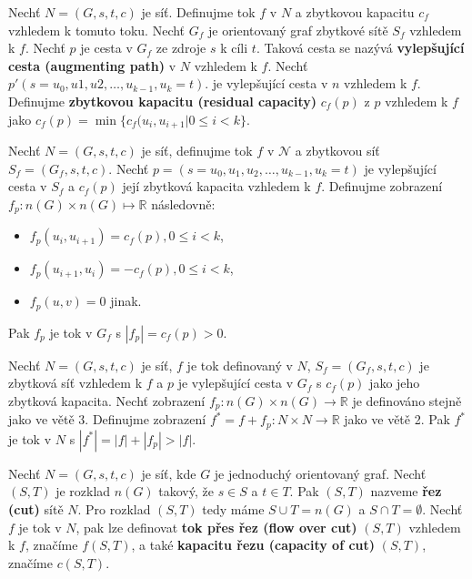 \begin{definition}
Nechť $N = (G, s, t, c)$ je síť. Definujme tok $f$ v $N$ a zbytkovou kapacitu $c_f$ vzhledem k tomuto toku. Nechť $G_f$ je orientovaný graf zbytkové sítě $S_f$ vzhledem k $f$. Nechť $p$ je cesta v $G_f$ ze zdroje $s$ k cíli $t$. Taková cesta se nazývá \textbf{vylepšující cesta (augmenting path)} v $N$ vzhledem k $f$. Nechť $p '(s = u_0, u1, u2, \ldots, u_{k-1}, u_k = t)$. je vylepšující cesta v $n$ vzhledem k $f$. Definujme \textbf{zbytkovou kapacitu (residual capacity)} $c_f (p)$ z $p$ vzhledem k $f$ jako $c_f (p) = \min \{ c_f (u_i, u_{i+1} | 0 \leq i  < k\}$.
\end{definition}

\begin{theorem}[3]
Nechť $N=(G,s,t,c)$ je síť, definujme tok $f$  v $\mathcal{N}$ a zbytkovou síť $S_f=(G_f,s,t,c)$. Nechť
$p=(s=u_0,u_1,u_2,\ldots,u_{k-1},u_k=t)$ je vylepšující cesta v $S_f$ a $c_f(p)$ její zbytková kapacita vzhledem k $f$. Definujme zobrazení $f_p: n(G)\times n(G)\mapsto \mathbb{R}$ následovně:
\begin{itemize}
    \item $f_p(u_i,u_{i+1})=c_f(p),0 \leq i < k$,
    \item $f_p(u_{i+1},u_i)=-c_f(p),0 \leq i < k$,
    \item $f_p(u,v)=0$ jinak.
\end{itemize}
Pak $f_p$ je tok v $G_f$ s $|f_p|=c_f(p) > 0$.
\end{theorem}

\begin{theorem}
Nechť $N=(G,s,t,c)$ je síť, $f$ je tok definovaný v $N$, $S_f=(G_f,s,t,c)$ je zbytková síť vzhledem k $f$ a $p$ je vylepšující cesta v $G_f$ s $c_f (p)$ jako jeho zbytková kapacita. Nechť zobrazení $f_p : n(G) \times n(G) \rightarrow \mathbb{R}$ je definováno stejně jako ve větě 3. Definujme zobrazení $f^{*} = f + f_p : N \times N \rightarrow \mathbb{R}$ jako ve větě 2. Pak $f^{*}$ je tok v $N$ s $ | f^{*} | = |f| + |f_p | > | f |$.
\end{theorem}

\begin{definition}
    Nechť $N=(G,s,t,c)$ je síť, kde $G$ je jednoduchý orientovaný graf. Nechť $(S,T)$ je rozklad $n(G)$ takový, že $s \in S$ a $t \in T$. Pak $(S,T)$ nazveme \textbf{řez (cut)} sítě $N$. Pro rozklad $(S,T)$ tedy máme $S \cup T = n(G)$ a $S \cap T = \emptyset$. Nechť $f$ je tok v $N$, pak lze definovat \textbf{tok přes řez (flow over cut)} $(S,T)$ vzhledem k $f$, značíme $f(S,T)$, a také \textbf{kapacitu řezu (capacity of cut)} $(S,T)$, značíme $c(S,T)$.
\end{definition}

